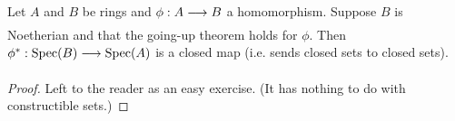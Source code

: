 \documentclass[../main]{subfiles}
\begin{document}
\newparagraph Let $A$ and $B$ be rings and $\phi : A \varrightarrow{} B$ a homomorphism. Suppose $B$ is Noetherian and that the going-up theorem holds for $\phi$. Then \newline $\SpecInduced{\phi}: \Spec(B) \varrightarrow{} \Spec(A)$ is a closed map (i.e. sends closed sets to closed sets).

\begin{proof} \renewcommand{\qedsymbol}{} %
Left to the reader as an easy exercise. (It has nothing to do with constructible sets.)
\end{proof}
\end{document}
